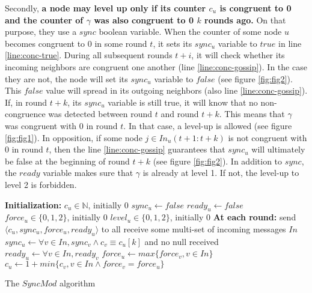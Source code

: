 \documentclass[11pt,letterpaper]{article}
\newcommand{\cent}{\gamma}
\begin{document}
Secondly, \textbf{a node may level up only if its counter $c_u$ is congruent to 0 and the counter of $\gamma$ was also congruent to 0 $k$ rounds ago.}
On that purpose, they use a $sync$ boolean variable.
When the counter of some node $u$ becomes congruent to 0 in some round $t$, it sets its $sync_u$ variable to $true$ in line \ref{line:conc-true}.
During all subsequent rounds $t+i$, it will check whether its incoming neighbors are congruent one another (line \ref{line:conc-gossip}).
In the case they are not, the node will set its $sync_u$ variable to $false$ (see figure \ref{fig:fig2}).
This $false$ value will spread in its outgoing neighbors (also line \ref{line:conc-gossip}).
If, in round $t+k$, its $sync_u$ variable is still true, it will know that no non-congruence was detected between round $t$ and round $t+k$.
This means that $\cent$ was congruent with 0 in round $t$.
In that case, a level-up is allowed (see figure \ref{fig:fig1}).
In opposition, if some node $j \in In_u(t+1:t+k)$ is not congruent with 0 in round $t$,
then the line \ref{line:conc-gossip} guarantees that $sync_u$ will ultimately be false at the beginning of round $t+k$ (see figure \ref{fig:fig2}).
In addition to $sync$, the $ready$ variable makes sure that $\cent$ is already at level 1.
If not, the level-up to level 2 is forbidden.


\begin{algorithm}[h]
	\DontPrintSemicolon
	\textbf{Initialization:} \;
	\Indp
		$c_u \in \mathds{N}$, initially 0 \;
		$sync_u \leftarrow false$ \;
		$ready_u \leftarrow false$ \;
		$force_u \in \{0, 1, 2\}$, initially 0 \;
		$level_u \in \{0, 1, 2\}$, initially 0 \;
	\BlankLine
	\Indm
	\textbf{At each round:} \;
	\Indp
		send $\langle c_u, sync_u, force_u, ready_u \rangle$ to all  \;
		receive some multi-set of incoming messages $In$ \;
		$sync_u \leftarrow \forall v \in In, sync_v \wedge c_v \equiv c_u [k]$ and no null received \; \label{line:conc-gossip}
		$ready_u \leftarrow \forall v \in In, ready_v$ \; \label{line:ready-gossip} 
		$force_u \leftarrow max \{force_v, v \in In \}$ \;\label{line:force}
		$c_u \leftarrow 1+ min \{c_v, v \in In \wedge force_v = force_u\}$ \;\label{line:min-z-end} 
	\Indm
\caption{The $SyncMod$ algorithm} 
\end{algorithm}
\end{document}
